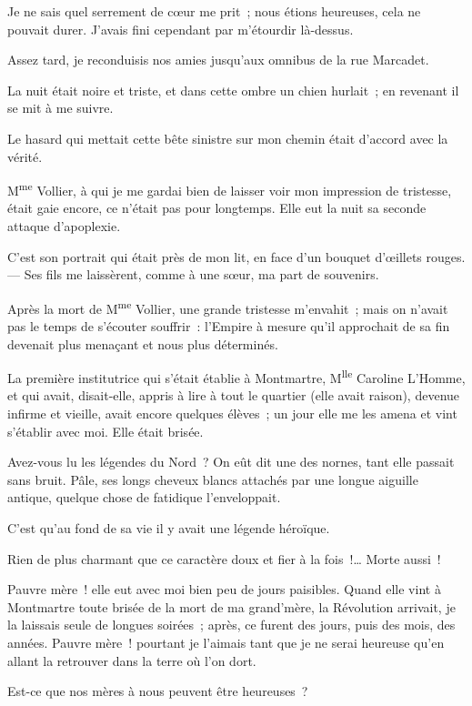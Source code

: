 \documentclass[french,twoside]{book} %
\begin{document}
Je ne sais quel serrement de cœur me prit ;  nous étions heureuses, cela ne pouvait durer. J’avais fini cependant par m’étourdir là-dessus.\par
Assez tard, je reconduisis nos amies jusqu’aux omnibus de la rue Marcadet.\par
La nuit était noire et triste, et dans cette ombre un chien hurlait ; en revenant il se mit à me suivre.\par
Le hasard qui mettait cette bête sinistre sur mon chemin était d’accord avec la vérité.\par
M\textsuperscript{me} Vollier, à qui je me gardai bien de laisser voir mon impression de tristesse, était gaie encore, ce n’était pas pour longtemps. Elle eut la nuit sa seconde attaque d’apoplexie.\par
C’est son portrait qui était près de mon lit, en face d’un bouquet d’œillets rouges. — Ses fils me laissèrent, comme à une sœur, ma part de souvenirs.\par
Après la mort de M\textsuperscript{me} Vollier, une grande tristesse m’envahit ; mais on n’avait pas le temps de s’écouter souffrir : l’Empire à mesure qu’il approchait de sa fin devenait plus menaçant et nous plus déterminés.\par
La première institutrice qui s’était établie à Montmartre, M\textsuperscript{lle} Caroline L’Homme, et qui avait, disait-elle, appris à lire à tout le quartier (elle avait raison), devenue infirme et vieille, avait encore quelques élèves ; un jour elle me les  amena et vint s’établir avec moi. Elle était brisée.\par
Avez-vous lu les légendes du Nord ? On eût dit une des nornes, tant elle passait sans bruit. Pâle, ses longs cheveux blancs attachés par une longue aiguille antique, quelque chose de fatidique l’enveloppait.\par
C’est qu’au fond de sa vie il y avait une légende héroïque.\par
Rien de plus charmant que ce caractère doux et fier à la fois !… Morte aussi !\par
\bigbreak
\noindent Pauvre mère ! elle eut avec moi bien peu de jours paisibles. Quand elle vint à Montmartre toute brisée de la mort de ma grand’mère, la Révolution arrivait, je la laissais seule de longues soirées ; après, ce furent des jours, puis des mois, des années. Pauvre mère ! pourtant je l’aimais tant que je ne serai heureuse qu’en allant la retrouver dans la terre où l’on dort.\par
Est-ce que nos mères à nous peuvent être heureuses ?\par
\end{document}
